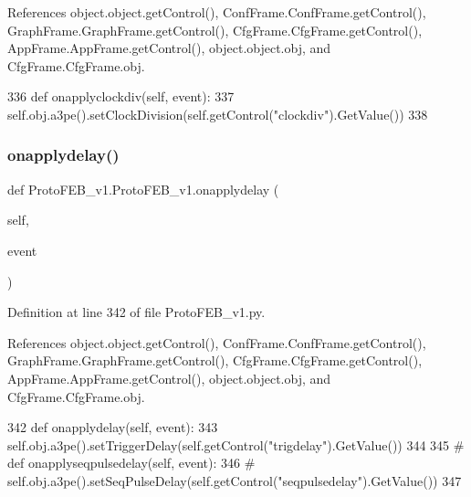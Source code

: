 References object.\+object.\+get\+Control(), Conf\+Frame.\+Conf\+Frame.\+get\+Control(), Graph\+Frame.\+Graph\+Frame.\+get\+Control(), Cfg\+Frame.\+Cfg\+Frame.\+get\+Control(), App\+Frame.\+App\+Frame.\+get\+Control(), object.\+object.\+obj, and Cfg\+Frame.\+Cfg\+Frame.\+obj.


\begin{DoxyCode}
336     \textcolor{keyword}{def }onapplyclockdiv(self, event):
337         self.obj.a3pe().setClockDivision(self.getControl(\textcolor{stringliteral}{"clockdiv"}).GetValue())
338 
\end{DoxyCode}
\mbox{\label{classProtoFEB__v1_1_1ProtoFEB__v1_a2d83c6aa70f086f76cd03957971c35a9}} 
\subsubsection{\texorpdfstring{onapplydelay()}{onapplydelay()}}
{\footnotesize\ttfamily def Proto\+F\+E\+B\+\_\+v1.\+Proto\+F\+E\+B\+\_\+v1.\+onapplydelay (\begin{DoxyParamCaption}\item[{}]{self,  }\item[{}]{event }\end{DoxyParamCaption})}



Definition at line 342 of file Proto\+F\+E\+B\+\_\+v1.\+py.



References object.\+object.\+get\+Control(), Conf\+Frame.\+Conf\+Frame.\+get\+Control(), Graph\+Frame.\+Graph\+Frame.\+get\+Control(), Cfg\+Frame.\+Cfg\+Frame.\+get\+Control(), App\+Frame.\+App\+Frame.\+get\+Control(), object.\+object.\+obj, and Cfg\+Frame.\+Cfg\+Frame.\+obj.


\begin{DoxyCode}
342     \textcolor{keyword}{def }onapplydelay(self, event):
343         self.obj.a3pe().setTriggerDelay(self.getControl(\textcolor{stringliteral}{"trigdelay"}).GetValue())
344 
345 \textcolor{comment}{#    def onapplyseqpulsedelay(self, event):}
346 \textcolor{comment}{#        self.obj.a3pe().setSeqPulseDelay(self.getControl("seqpulsedelay").GetValue())}
347 
\end{DoxyCode}
\mbox{\label{classProtoFEB__v1_1_1ProtoFEB__v1_affa41d5c50897be4f575bca04c73fd2b}} 
